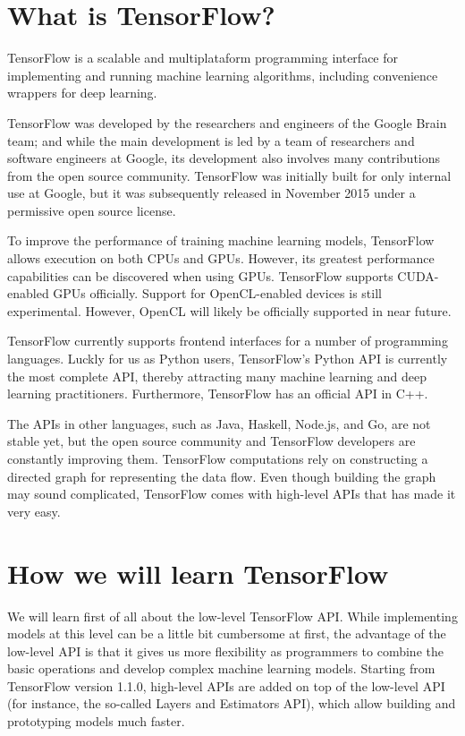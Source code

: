 \documentclass[11pt]{article}
\begin{document}
    \section{What is TensorFlow?}\label{what-is-tensorflow}

    TensorFlow is a scalable and multiplataform programming interface for
implementing and running machine learning algorithms, including
convenience wrappers for deep learning.

TensorFlow was developed by the researchers and engineers of the Google
Brain team; and while the main development is led by a team of
researchers and software engineers at Google, its development also
involves many contributions from the open source community. TensorFlow
was initially built for only internal use at Google, but it was
subsequently released in November 2015 under a permissive open source
license.

To improve the performance of training machine learning models,
TensorFlow allows execution on both CPUs and GPUs. However, its greatest
performance capabilities can be discovered when using GPUs. TensorFlow
supports CUDA-enabled GPUs officially. Support for OpenCL-enabled
devices is still experimental. However, OpenCL will likely be officially
supported in near future.

TensorFlow currently supports frontend interfaces for a number of
programming languages. Luckly for us as Python users, TensorFlow's
Python API is currently the most complete API, thereby attracting many
machine learning and deep learning practitioners. Furthermore,
TensorFlow has an official API in C++.

The APIs in other languages, such as Java, Haskell, Node.js, and Go, are
not stable yet, but the open source community and TensorFlow developers
are constantly improving them. TensorFlow computations rely on
constructing a directed graph for representing the data flow. Even
though building the graph may sound complicated, TensorFlow comes with
high-level APIs that has made it very easy.

    \section{How we will learn
TensorFlow}\label{how-we-will-learn-tensorflow}

    We will learn first of all about the low-level TensorFlow API. While
implementing models at this level can be a little bit cumbersome at
first, the advantage of the low-level API is that it gives us more
flexibility as programmers to combine the basic operations and develop
complex machine learning models. Starting from TensorFlow version 1.1.0,
high-level APIs are added on top of the low-level API (for instance, the
so-called Layers and Estimators API), which allow building and
prototyping models much faster.
\end{document}
